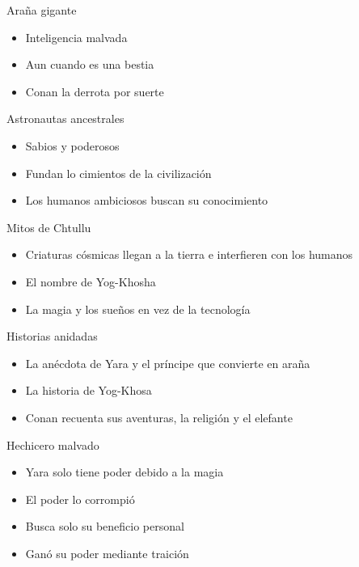 \begin{frame}{Araña gigante}
 \begin{itemize}
    \item Inteligencia malvada
    \item Aun cuando es una bestia
    \item Conan la derrota por suerte
 \end{itemize}
\end{frame}

\begin{frame}{Astronautas ancestrales}
 \begin{itemize}
    \item Sabios y poderosos
    \item Fundan lo cimientos de la civilización
    \item Los humanos ambiciosos buscan su conocimiento
 \end{itemize}
\end{frame}

\begin{frame}{Mitos de Chtullu}
 \begin{itemize}
    \item Criaturas cósmicas llegan a la tierra e interfieren con los humanos
    \item El nombre de Yog-Khosha
    \item La magia y los sueños en vez de la tecnología
 \end{itemize}
\end{frame}

\begin{frame}{Historias anidadas}
 \begin{itemize}
    \item La anécdota de Yara y el príncipe que convierte en araña
    \item La historia de Yog-Khosa
    \item Conan recuenta sus aventuras, la religión y el elefante
 \end{itemize}
\end{frame}

\begin{frame}{Hechicero malvado}
 \begin{itemize}
    \item Yara solo tiene poder debido a la magia
    \item El poder lo corrompió
    \item Busca solo su beneficio personal
    \item Ganó su poder mediante traición
 \end{itemize}
\end{frame}

\begin{frame}{}
    \maketitle
\end{frame}
